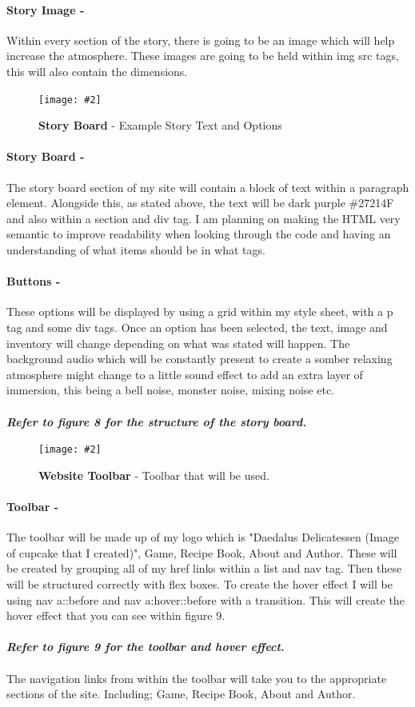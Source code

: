 \documentclass[10pt, a4paper]{article}
\newcommand{\figuremacro}[5]{
    \begin{figure}[#1]
        \centering
        \texttt{[image: \#2]}
        \caption[#3]{\textbf{#3}#4}
        \label{fig:#2}
    \end{figure}
}
\begin{document}
    \paragraph{Story Image - }Within every section of the story, there is going to be an image which will help increase the atmosphere. These images are going to be held within img src tags, this will also contain the dimensions.
    \figuremacro{h}{interface-story}{Story Board}{ - Example Story Text and Options}{1.0}
    \paragraph{Story Board - }The story board section of my site will contain a block of text within a paragraph element. Alongside this, as stated above, the text will be dark purple \#27214F and also within a section and div tag. I am planning on making the HTML very semantic to improve readability when looking through the code and having an understanding of what items should be in what tags. 
    \paragraph{Buttons - }These options will be displayed by using a grid within my style sheet, with a p tag and some div tags. Once an option has been selected, the text, image and inventory will change depending on what was stated will happen. The background audio which will be constantly present to create a somber relaxing atmosphere might change to a little sound effect to add an extra layer of immersion, this being a bell noise, monster noise, mixing noise etc. \\
    \\
    \textbf{\textit{Refer to figure 8 for the structure of the story board.}}
    \figuremacro{h}{interface-toolbar}{Website Toolbar}{ - Toolbar that will be used.}{1.0}
    \paragraph{Toolbar - } The toolbar will be made up of my logo which is "Daedalus Delicatessen (Image of cupcake that I created)", Game, Recipe Book, About and Author. These will be created by grouping all of my href links within a list and nav tag. Then these will be structured correctly with flex boxes. To create the hover effect I will be using nav a::before and nav a:hover::before with a transition. This will create the hover effect that you can see within figure 9.\\
    \\
    \textbf{\textit{Refer to figure 9 for the toolbar and hover effect.}} \\
    \\
    The navigation links from within the toolbar will take you to the appropriate sections of the site. Including; Game, Recipe Book, About and Author. 
\end{document}
